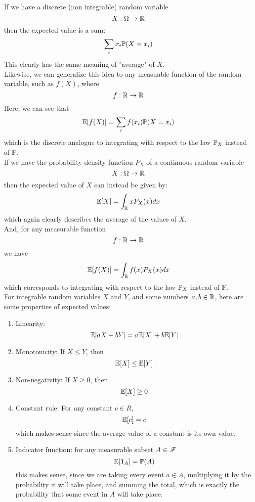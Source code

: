 \documentclass[12pt]{article}
\begin{document}
    If we have a discrete (non integrable)
    random variable
    \[ X: \Omega \to \mathbb{R} \]
    then the expected value is a sum:
    \[ \sum_{i}x_i\mathbb{P}(X = x_i) \]
    This clearly has the same meaning
    of "average" of $X$. \\

    Likewise, we can generalize this idea
    to any measuable function of the random variable,
    such as $f(X)$, where
    \[ f: \mathbb{R} \to \mathbb{R} \]
    Here, we can see that
    \[ \mathbb{E}[f(X)] = \sum_{i}f(x_i)\mathbb{P}(X = x_i) \]
    which is the discrete analogue to
    integrating with respect to the law
    $\mathbb{P}_X$ instead of $\mathbb{P}$. \\

    If we have the probability
    density function $P_X$ of a continuous
    random variable
    \[ X: \Omega \to \mathbb{R} \]
    then the expected value of $X$
    can instead be given by:
    \[ \mathbb{E}[X] = \int_{\mathbb{R}} x P_X(x) dx \]
    which again clearly describes the average
    of the values of $X$. \\
    
    And, for any measurable function
    \[ f: \mathbb{R} \to \mathbb{R} \]
    we have
    \[ \mathbb{E}[f(X)] = \int_{\mathbb{R}} f(x)P_X(x) dx \]
    which corresponds to
    integrating with respect to the law
    $\mathbb{P}_X$ instead of $\mathbb{P}$. \\

    For integrable random variables $X$ and $Y$,
    and some numbers $a, b \in \mathbb{R}$,
    here are some properties of expected values:
    \begin{enumerate}
        \item 
        Linearity:
        \[ \mathbb{E}[aX + bY] = a\mathbb{E}[X] + b\mathbb{E}[Y] \]
        \item 
        Monotonicity: If $X \leq Y$, then 
        \[ \mathbb{E}[X] \leq \mathbb{E}[Y] \]
        \item
        Non-negativity: If $X \geq 0$, then
        \[ \mathbb{E}[X] \geq 0 \]
        \item
        Constant rule: For any constant $c \in R$,
        \[ \mathbb{E}[c] = c \]
        which makes sense since the average value
        of a constant is its own value.
        \item
        Indicator function:
        for any measurable subset $A \in \mathscr{F}$
        \[ \mathbb{E}[1_A] = \mathbb{P}(A) \]
        this makes sense, since
        we are taking every event $a \in A$,
        multiplying it by the probability
        it will take place, and summing the total,
        which is exactly the probability that
        some event in $A$ will take place. \\
    \end{enumerate}
\end{document}
